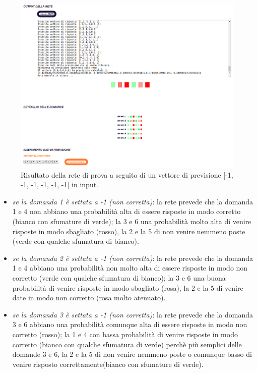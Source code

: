 \begin{itemize}
\begin{figure}[H]
\centering
	\includegraphics[width=0.90\linewidth]{./image/rete_prova-vpmeno1.png}
	\caption{Risultato della rete di prova a seguito di un vettore di previsione [-1, -1, -1, -1, -1, -1] in input.}
	\label{Risultato della rete di prova a seguito di un vettore di previsione [-1, -1, -1, -1, -1, -1] in input.}
\end{figure}
\begin{itemize}
\item \textit{se la domanda 1 \`e settata a -1 (non corretta)}: la rete prevede che la domanda 1 e 4 non abbiano una probabilit\`a alta di essere risposte in modo corretto (bianco con sfumature di verde); la 3 e 6 una probabilit\`a molto alta di venire risposte in modo sbagliato (rosso), la 2 e la 5 di non venire nemmeno poste (verde con qualche sfumatura di bianco).
\item \textit{se la domanda 2 \`e settata a -1 (non corretta)}: la rete prevede che la domanda 1 e 4 abbiano una probabilit\`a non molto alta di essere risposte in modo non corretto (verde con qualche sfumatura di bianco); la 3 e 6 una buona probabilit\`a di venire risposte in modo sbagliato (rosa), la 2 e la 5 di venire date in modo non corretto (rosa molto atenuato).
\item \textit{se la domanda 3 \`e settata a -1 (non corretta)}: la rete prevede che la domanda 3 e 6 abbiano una probabilit\`a comunque alta di essere risposte in modo non corretto (rosso); la 1 e 4 con bassa probabilit\`a di venire risposte in modo corretto (bianco con qualche sfumatura di verde) perch\`e pi\`u semplici delle domande 3 e 6, la 2 e la 5 di non venire nemmeno poste o comunque basso di venire risposto correttamente(bianco con sfumature di verde).

\end{itemize}
\end{itemize}
